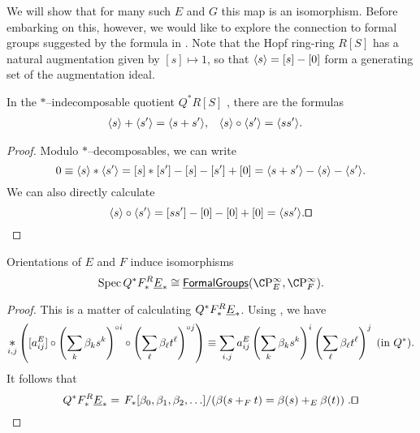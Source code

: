 We will show that for many such $E$ and $G$ this map is an isomorphism.  Before embarking on this, however, we would like to explore the connection to formal groups suggested by the formula in .  Note that the Hopf ring-ring $R[S]$ has a natural augmentation given by $[s] \mapsto 1$, so that $\langle s\rangle = [s] - [0]$ form a generating set of the augmentation ideal.
\begin{lemma}\label{ArithmeticInQAst}
In the $\ast$--indecomposable quotient $Q^* R[S]$ , there are the formulas
\begin{align*}
\langle s\rangle + \langle s'\rangle & = \langle s + s'\rangle, &
\langle s\rangle \circ \langle s'\rangle & = \langle s s'\rangle.
\end{align*}
\end{lemma}

\begin{proof}
Modulo $\ast$--decomposables, we can write  \[0 \equiv \langle s\rangle \ast \langle s'\rangle = [s] \ast [s'] - [s] - [s'] + [0] = \langle s + s'\rangle - \langle s\rangle - \langle s'\rangle.\]  We can also directly calculate \[\<s\> \circ \<s'\> = [s s'] - [0] - [0] + [0] = \<s s'\>. \qed\]
\end{proof}

\begin{corollary}
Orientations of $E$ and $F$ induce isomorphisms
\[\Spec Q^* F_*^R \OS{E}{*} \cong \InternalHom{FormalGroups}(\CP^\infty_E, \CP^\infty_F).\]
\end{corollary}
\begin{proof}
This is a matter of calculating $Q^* F_*^R \underline{\smash{E}}_{*}$.  Using , we have \[\bigast_{i, j} \left([a_{ij}^E] \circ \left( \sum_k \beta_k s^k \right)^{\circ i} \circ \left( \sum_\ell \beta_\ell t^\ell \right)^{\circ j} \right) \equiv \sum_{i, j} a_{ij}^E \left( \sum_k \beta_k s^k \right)^i \left( \sum_\ell \beta_\ell t^\ell \right)^j \;\text{(in $Q^*$)}.\]  It follows that \[Q^* F_*^R \OS{E}{*} = \left. F_*[\beta_0, \beta_1, \beta_2, \ldots] \middle/ \left( \beta(s +_F t) = \beta(s) +_E \beta(t) \right) \right. . \qed\] 
\end{proof}

